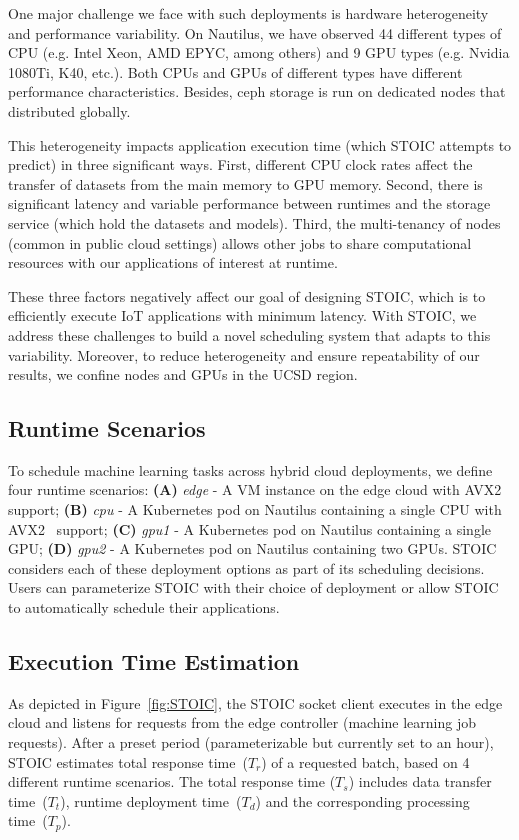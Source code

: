 One major challenge we face with such deployments is hardware heterogeneity and performance variability. On Nautilus, we have observed 44 different types of CPU (e.g. Intel Xeon, AMD EPYC, among others) and 9 GPU types (e.g. Nvidia 1080Ti, K40, etc.). Both CPUs and GPUs of different types have different performance characteristics. Besides, ceph storage is run on dedicated nodes that distributed globally.

This heterogeneity impacts application execution time (which STOIC attempts to predict) in three significant ways. First, different CPU clock rates affect the transfer of datasets from the main memory to GPU memory. Second, there is significant latency and variable performance between runtimes and the storage service (which hold the datasets and models). Third, the multi-tenancy of nodes (common in public cloud settings) allows other jobs to share computational resources with our applications of interest at runtime. 

These three factors negatively affect our goal of designing STOIC, which is to efficiently execute IoT applications with minimum latency. With STOIC, we address these challenges to build a novel scheduling system that adapts to this variability. Moreover, to reduce heterogeneity and ensure repeatability of our results, we confine nodes and GPUs in the UCSD region.

\subsection{Runtime Scenarios}
To schedule machine learning tasks across hybrid cloud deployments, we define four runtime scenarios: \textbf{(A)} \textit{edge} - A VM instance on the edge cloud with AVX2~\cite{ref:avx} support; \textbf{(B)} \textit{cpu} - A Kubernetes pod on Nautilus containing a single CPU with AVX2~\cite{ref:avx} support; \textbf{(C)} \textit{gpu1} - A Kubernetes pod on Nautilus containing a single GPU; \textbf{(D)} \textit{gpu2} - A Kubernetes pod on Nautilus containing two GPUs. 
STOIC considers each of these deployment options as part of its scheduling decisions. Users can parameterize STOIC with their choice of deployment or allow STOIC to automatically schedule their applications.


\subsection{Execution Time Estimation}
 As depicted in Figure~\ref{fig:STOIC}, 
the STOIC socket client executes in the edge 
cloud and listens for requests from the edge controller (machine learning job requests). After a preset period (parameterizable but currently set to an hour), STOIC estimates total response time~($T_r$) of a requested batch, based on 4 different runtime scenarios. The total response time ($T_s$) includes data transfer time~($T_t$), runtime deployment time~($T_d$) and the corresponding processing time~($T_p$).
 
